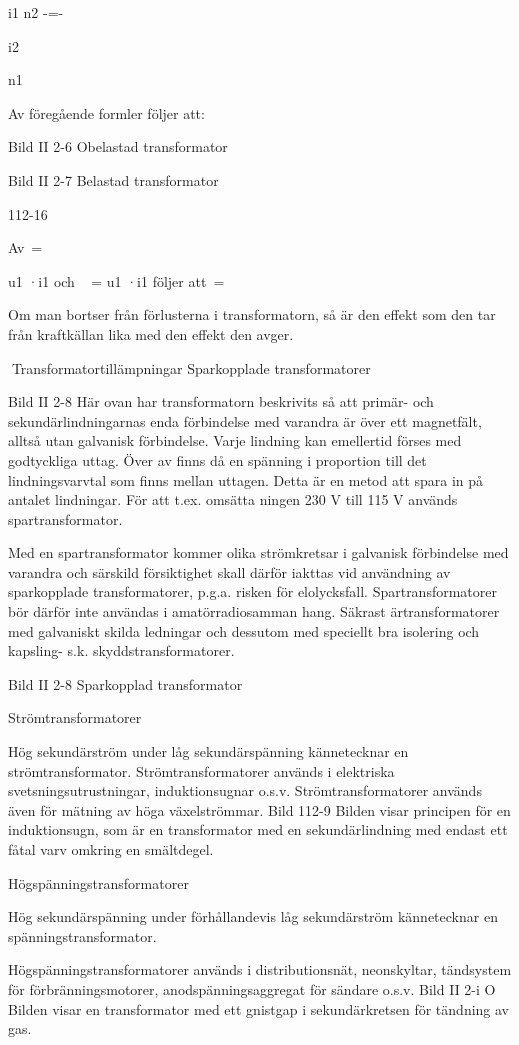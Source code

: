 \documentclass[a4paper,twoside,twocolumn,openright]{book}
\begin{document}
{{{i1 n2
-=-

i2

n1

Av föregående formler följer att:

Bild II 2-6 Obelastad transformator

Bild II 2-7 Belastad transformator

112-16

Av~=

u1 ·i1 och ~ = u1 ·i1 följer att~=~

Om man bortser från förlusterna i transformatorn, så är den effekt som den tar från
kraftkällan lika med den effekt den avger.

Transformatortillämpningar
Sparkopplade transformatorer

Bild II 2-8
Här ovan har transformatorn beskrivits så att
primär- och sekundärlindningarnas enda
förbindelse med varandra är över ett magnetfält, alltså utan galvanisk förbindelse.
Varje lindning kan emellertid förses med
godtyckliga uttag. Över
av
finns då en spänning i proportion till det
lindningsvarvtal som finns mellan uttagen.
Detta är en metod att spara in på antalet
lindningar. För att t.ex. omsätta
ningen 230 V till 115 V används
spartransformator.

Med en spartransformator kommer olika
strömkretsar i galvanisk förbindelse med
varandra och särskild försiktighet skall därför iakttas vid användning av sparkopplade
transformatorer, p.g.a. risken för elolycksfall. Spartransformatorer bör därför inte användas i amatörradiosamman hang. Säkrast
ärtransformatorer med galvaniskt skilda ledningar och dessutom med speciellt bra isolering och kapsling- s.k. skyddstransformatorer.

Bild II 2-8 Sparkopplad transformator

Strömtransformatorer

Hög sekundärström under låg sekundärspänning kännetecknar en strömtransformator.
Strömtransformatorer används i elektriska svetsningsutrustningar, induktionsugnar
o.s.v. Strömtransformatorer används även
för mätning av höga växelströmmar.
Bild 112-9
Bilden visar principen för en induktionsugn, som är en transformator med en sekundärlindning med endast ett fåtal varv omkring en smältdegel.

Högspänningstransformatorer

Hög sekundärspänning under förhållandevis låg sekundärström kännetecknar en
spänningstransformator.

Högspänningstransformatorer används i
distributionsnät, neonskyltar, tändsystem för
förbränningsmotorer, anodspänningsaggregat för sändare o.s.v.
Bild II 2-i O
Bilden visar en transformator med ett gnistgap i sekundärkretsen för tändning av gas.

}}}
\end{document}
